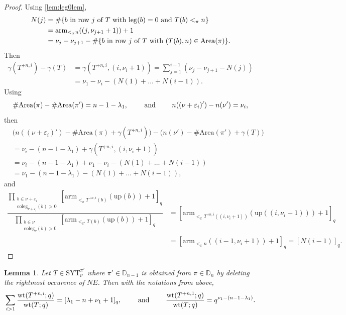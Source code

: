 \documentclass[12pt,reqno]{amsart}
\theoremstyle{plain}
\newtheorem{lemma}[theorem]{Lemma}
\theoremstyle{definition}
\theoremstyle{remark}
\theoremstyle{example}
\numberwithin{equation}{section}
\newcommand\up{\mathrm{up}}
\newcommand\arm{\mathrm{arm}}
\newcommand\leg{\mathrm{leg}}
\newcommand{\coleg}{\mathrm{coleg}}
\newcommand{\SYT}{\mathrm{SYT}}
\newcommand{\wt}{\mathrm{wt}}
\newcommand{\Area}{\mathrm{Area}}
\newcommand{\DD}{\mathbb{D}}
\begin{document}
\begin{proof}

	Using \autoref{lem:leg0lem}, \begin{align}
		N(j) &= \# \{ b \hbox{ in row } j \hbox{ of } T \hbox{ with } \leg(b) = 0 \hbox{ and } T(b) <_\pi n \} 
		\nonumber
		\\
		&= \arm_{<_\pi n}((j,\nu_{j+1}+1))+1 
		\nonumber
		\\
		&= \nu_{j}-\nu_{j+1} - \#\{b \hbox{ in row } j \hbox{ of } T \hbox{ with } (T(b),n) \in \Area(\pi)\}.
		\label{eq:Njprecrel}
	\end{align} 
	Then 
	\begin{align*}
		\gamma(T^{+n,i}) - \gamma(T) 
		&= \gamma(T^{+n,i},(i,\nu_i+1)) 
		= \sum_{j=1}^{i-1}(\nu_j-\nu_{j+1} - N(j)) 
		\\
		&= \nu_1 - \nu_i -  (N(1)+\ldots + N(i-1)).
	\end{align*} 	
	Using 	\begin{align*}
		\# \Area(\pi) - \# \Area(\pi') = n - 1 - \lambda_1,
		\qquad \hbox{ and } \qquad
		n((\nu+\varepsilon_i)')-n(\nu') = \nu_i,
	\end{align*} then
	 \begin{align*}
		&\big(n((\nu+\varepsilon_i)')-\# \Area(\pi)+ \gamma(T^{+n,i}) \big)
		- \big( n(\nu')-\# \Area(\pi') + \gamma(T) \big)
		\\
		&= \nu_i - (n-1-\lambda_1) +  \gamma(T^{+n,i},(i,\nu_i+1))
		\\
		&= \nu_i - (n-1-\lambda_1) + \nu_1 - \nu_i -  (N(1)+\ldots + N(i-1))
		\\
		&= \nu_1 - (n-1-\lambda_1)  - (N(1)+\ldots+N(i-1)),
	\end{align*} 
	and \begin{align*}
		\dfrac{\prod\limits_{\substack{b \in \nu+\varepsilon_i \\ \coleg_{\nu+\varepsilon_i}(b)>0}} [\arm_{<_\pi T^{+n,i}(b)}(\up(b))+1]_q}{\prod\limits_{\substack{b \in \nu \\ \coleg_\nu(b)>0}} [\arm_{<_{\pi'} T(b)}(\up(b))+1]_q} &= [\arm_{<_\pi T^{+n,i}((i,\nu_i+1))}(\up((i,\nu_i+1)))+1]_q
		\\
		&= [\arm_{<_{\pi} n}((i-1,\nu_i+1))+1]_q = [N(i-1)]_q.
	\end{align*}
\end{proof}



\begin{lemma}\label{lem:wtcomparison}
	Let $T \in \SYT^{\pi'}_\nu$ where $\pi' \in \DD_{n-1}$ is obtained from $\pi \in \DD_n$ by deleting the rightmost occurence of $NE$. Then with the notations from above,
	\begin{align}\label{eq:wtcomparisoncases}
		\sum_{i>1} \dfrac{\wt(T^{+n,i};q)}{\wt(T;q)} = [\lambda_1-n+\nu_1+1]_q, \qquad \hbox{ and } \qquad \dfrac{\wt(T^{+n,1};q)}{\wt(T;q)} = q^{\nu_1 - (n-1-\lambda_1)}.
	\end{align} 
\end{lemma}
\end{document}
